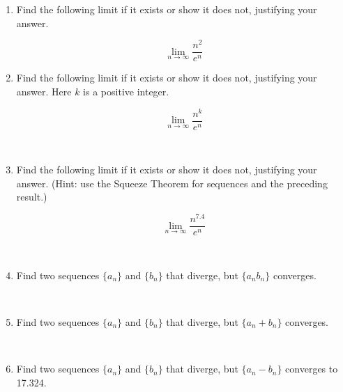 \documentclass[11pt, oneside]{article}   	%
\title{}
\author{Week 9 discussion problems}
\date{}							%
\begin{document}
\maketitle

\begin{enumerate}



 \item 
Find the following limit if it exists or show it does not, justifying your answer.




$$ \lim_{n \to \infty} \dfrac{n^2}{e^n}$$

\item
Find the following limit if it exists or show it does not, justifying your answer. Here $k$ is a positive integer.

$$ \lim_{n \to \infty} \dfrac{n^k}{e^n}$$

\
\item
Find the following limit if it exists or show it does not, justifying your answer. (Hint: use the Squeeze Theorem for sequences and the preceding result.)

$$ \lim_{n \to \infty} \dfrac{n^{7.4}}{e^n} $$

\

\item Find two sequences $\{a_n\}$ and $\{b_n\}$ that diverge, but $\{a_nb_n\}$ converges.
 
\

 \item Find two sequences $\{a_n\}$ and $\{b_n\}$ that diverge, but $\{a_n+b_n\}$ converges.
 
\

 \item Find two sequences $\{a_n\}$ and $\{b_n\}$ that diverge, but $\{a_n-b_n\}$ converges to 17.324.

 \end{enumerate}
\end{document}
